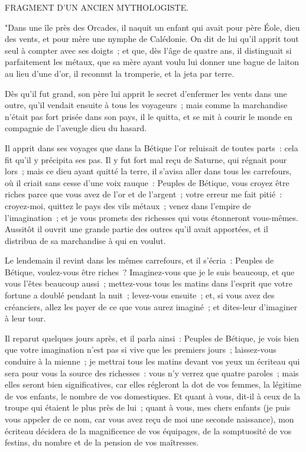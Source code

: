 \documentclass[french,twoside]{book} %
\begin{document}
\begin{center}
\noindent \centerline{FRAGMENT D’UN ANCIEN MYTHOLOGISTE.}\par
\end{center}

\noindent "Dans une île près des Orcades, il naquit un enfant qui avait pour père Éole, dieu des vents, et pour mère une nymphe de Calédonie. On dit de lui qu’il apprit tout seul à compter avec ses doigts ; et que, dès l’âge de quatre ans, il distinguait si parfaitement les métaux, que sa mère ayant voulu lui donner une bague de laiton au lieu d’une d’or, il reconnut la tromperie, et la jeta par terre.\par
Dès qu’il fut grand, son père lui apprit le secret d’enfermer les vents dans une outre, qu’il vendait ensuite à tous les voyageurs ; mais comme la marchandise n’était pas fort prisée dans son pays, il le quitta, et se mit à courir le monde en compagnie de l’aveugle dieu du hasard.\par
Il apprit dans ses voyages que dans la Bétique l’or reluisait de toutes parts : cela fit qu’il y précipita ses pas. Il y fut fort mal reçu de Saturne, qui régnait pour lors ; mais ce dieu ayant quitté la terre, il s’avisa aller dans tous les carrefours, où il criait sans cesse d’une voix rauque : Peuples de Bétique, vous croyez être riches parce que vous avez de l’or et de l’argent ; votre erreur me fait pitié : croyez-moi, quittez le pays des vils métaux ; venez dans l’empire de l’imagination ; et je vous promets des richesses qui vous étonneront vous-mêmes. Aussitôt il ouvrit une grande partie des outres qu’il avait apportées, et il distribua de sa marchandise à qui en voulut.\par
Le lendemain il revint dans les mêmes carrefours, et il s’écria : Peuples de Bétique, voulez-vous être riches ? Imaginez-vous que je le suis beaucoup, et que vous l’êtes beaucoup aussi ; mettez-vous tous les matins dans l’esprit que votre fortune a doublé pendant la nuit ; levez-vous ensuite ; et, si vous avez des créanciers, allez les payer de ce que vous aurez imaginé ; et dites-leur d’imaginer à leur tour.\par
Il reparut quelques jours après, et il parla ainsi : Peuples de Bétique, je vois bien que votre imagination n’est pas si vive que les premiers jours ; laissez-vous conduire à la mienne ; je mettrai tous les matins devant vos yeux un écriteau qui sera pour vous la source des richesses : vous n’y verrez que quatre paroles ; mais elles seront bien significatives, car elles régleront la dot de vos femmes, la légitime de vos enfants, le nombre de vos domestiques. Et quant à vous, dit-il à ceux de la troupe qui étaient le plus près de lui ; quant à vous, mes chers enfants (je puis vous appeler de ce nom, car vous avez reçu de moi une seconde naissance), mon écriteau décidera de la magnificence de vos équipages, de la somptuosité de vos festins, du nombre et de la pension de vos maîtresses.\par
\end{document}
